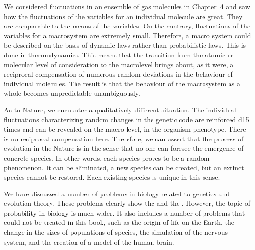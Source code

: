  We considered fluctuations in an
ensemble of gas molecules in Chapter~4 and saw how the fluctuations of
the variables for an individual molecule are great. They are comparable
to the means of the variables. On the contrary, fluctuations of the
variables for a macrosystem are extremely small. Therefore,
a macro system could be described on the basis of dynamic laws rather
than probabilistic laws. This is done in thermodynamics. This means
that the transition from the atomic or molecular level of consideration
to the macrolevel brings about, as it were, a reciprocal compensation of
numerous random deviations in the behaviour of individual molecules.
The result is that the behaviour of the macrosystem as a whole becomes
unpredictable unambiguously.

As to Nature, we encounter a qualitatively different situation. The
individual fluctuations characterizing random changes in the genetic
code are reinforced \num{d15} times and can be revealed on the macro level, in the organism phenotype. There is no reciprocal compensation here.  Therefore, we can assert that the process of evolution in the Nature is  in the sense that no one can foresee the emergence of concrete species. In other words, each species proves to be a random phenomenon. It can be eliminated, a new species can be created, but an extinct species cannot be restored. Each existing species is unique in this sense.

 We have discussed a number of problems in biology
related to genetics and evolution theory. These problems clearly show
the  and the . However, the topic of probability in biology is much wider. It
also includes a number of problems that could not be treated in this
book, such as the origin of life on the Earth, the change in the sizes of
populations of species, the simulation of the nervous system, and the
creation of a model of the human brain.
